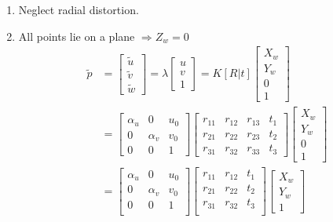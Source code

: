 \documentclass[10pt,a4paper]{scrartcl}
\begin{document}
\begin{multicols*}{2}
\begin{enumerate}
\item Neglect radial distortion.
\item All points lie on a plane $\Rightarrow Z_w =0$
\begin{align*}
\tilde{p}&=\begin{bmatrix}
\tilde{u}\\\tilde{v}\\\tilde{w}
\end{bmatrix}=\lambda\begin{bmatrix}
u\\v\\1
\end{bmatrix}=K[R|t]\begin{bmatrix}
X_w\\Y_w\\0\\1
\end{bmatrix}\\
&=\begin{bmatrix}
\alpha_u&0&u_0\\
0&\alpha_v&v_0\\
0&0&1
\end{bmatrix}\begin{bmatrix}
r_{11}&r_{12}&r_{13}&t_1\\
r_{21}&r_{22}&r_{23}&t_2\\
r_{31}&r_{32}&r_{33}&t_3
\end{bmatrix}\begin{bmatrix}
X_w\\Y_w\\0\\1
\end{bmatrix}\\
&=\begin{bmatrix}
\alpha_u&0&u_0\\
0&\alpha_v&v_0\\
0&0&1\\
\end{bmatrix}
\begin{bmatrix}
r_{11}&r_{12}&t_1\\
r_{21}&r_{22}&t_2\\
r_{31}&r_{32}&t_3\\
\end{bmatrix}\begin{bmatrix}
X_w\\Y_w\\1
\end{bmatrix}\\

\end{align*}
\end{enumerate}
\end{multicols*}
\end{document}
